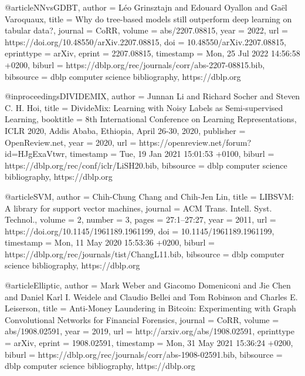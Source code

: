 @article{NNvsGDBT,
  author    = {L{\'{e}}o Grinsztajn and
               Edouard Oyallon and
               Ga{\"{e}}l Varoquaux},
  title     = {Why do tree-based models still outperform deep learning on tabular
               data?},
  journal   = {CoRR},
  volume    = {abs/2207.08815},
  year      = {2022},
  url       = {https://doi.org/10.48550/arXiv.2207.08815},
  doi       = {10.48550/arXiv.2207.08815},
  eprinttype = {arXiv},
  eprint    = {2207.08815},
  timestamp = {Mon, 25 Jul 2022 14:56:58 +0200},
  biburl    = {https://dblp.org/rec/journals/corr/abs-2207-08815.bib},
  bibsource = {dblp computer science bibliography, https://dblp.org}
}

@inproceedings{DIVIDEMIX,
  author    = {Junnan Li and
               Richard Socher and
               Steven C. H. Hoi},
  title     = {DivideMix: Learning with Noisy Labels as Semi-supervised Learning},
  booktitle = {8th International Conference on Learning Representations, {ICLR} 2020,
               Addis Ababa, Ethiopia, April 26-30, 2020},
  publisher = {OpenReview.net},
  year      = {2020},
  url       = {https://openreview.net/forum?id=HJgExaVtwr},
  timestamp = {Tue, 19 Jan 2021 15:01:53 +0100},
  biburl    = {https://dblp.org/rec/conf/iclr/LiSH20.bib},
  bibsource = {dblp computer science bibliography, https://dblp.org}
}


@article{SVM,
  author    = {Chih{-}Chung Chang and
               Chih{-}Jen Lin},
  title     = {{LIBSVM:} {A} library for support vector machines},
  journal   = {{ACM} Trans. Intell. Syst. Technol.},
  volume    = {2},
  number    = {3},
  pages     = {27:1--27:27},
  year      = {2011},
  url       = {https://doi.org/10.1145/1961189.1961199},
  doi       = {10.1145/1961189.1961199},
  timestamp = {Mon, 11 May 2020 15:53:36 +0200},
  biburl    = {https://dblp.org/rec/journals/tist/ChangL11.bib},
  bibsource = {dblp computer science bibliography, https://dblp.org}
}

@article{Elliptic,
  author    = {Mark Weber and
               Giacomo Domeniconi and
               Jie Chen and
               Daniel Karl I. Weidele and
               Claudio Bellei and
               Tom Robinson and
               Charles E. Leiserson},
  title     = {Anti-Money Laundering in Bitcoin: Experimenting with Graph Convolutional
               Networks for Financial Forensics},
  journal   = {CoRR},
  volume    = {abs/1908.02591},
  year      = {2019},
  url       = {http://arxiv.org/abs/1908.02591},
  eprinttype = {arXiv},
  eprint    = {1908.02591},
  timestamp = {Mon, 31 May 2021 15:36:24 +0200},
  biburl    = {https://dblp.org/rec/journals/corr/abs-1908-02591.bib},
  bibsource = {dblp computer science bibliography, https://dblp.org}
}

